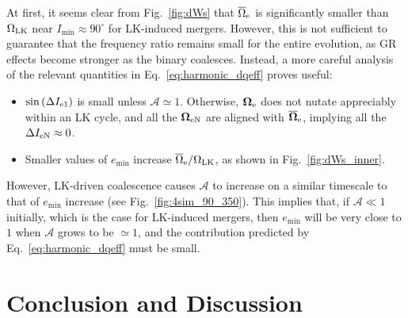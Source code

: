 \documentclass[
        twocolumn,
        twocolappendix
    ]{aastex63}
\renewcommand*{\bm}[1]{\boldsymbol{\mathbf{#1}}}
\newcommand*{\p}[1]{\left(#1\right)}
\begin{document}
At first, it seems clear from Fig.~\ref{fig:dWs} that $\overline{\Omega}_{\rm e}$
is significantly smaller than $\Omega_{\rm LK}$ near $I_{\min} \approx 90^\circ$
for LK-induced mergers. However, this is not sufficient to guarantee that the
frequency ratio remains small for the entire evolution, as GR effects become
stronger as the binary coalesces. Instead, a more careful analysis of the
relevant quantities in Eq.~\eqref{eq:harmonic_dqeff} proves useful:
\begin{itemize}
    \item $\sin \p{\Delta I_{\rm e1}}$ is small unless $\mathcal{A} \simeq
        1$. Otherwise, $\bm{\Omega}_{\rm e}$ does not nutate appreciably within
        an LK cycle, and all the $\bm{\Omega}_{\rm eN}$ are aligned with
        $\bm{\overline{\Omega}}_{\rm e}$, implying all the $\Delta I_{\rm eN}
        \approx 0$.

    \item Smaller values of $e_{\min}$ increase $\overline{\Omega}_{\rm e} /
        \Omega_{\rm LK}$, as shown in Fig.~\ref{fig:dWs_inner}.
\end{itemize}
However, LK-driven coalescence causes $\mathcal{A}$ to increase on a similar
timescale to that of $e_{\min}$ increase (see Fig.~\ref{fig:4sim_90_350}). This
implies that, if $\mathcal{A} \ll 1$ initially, which is the case for LK-induced
mergers, then $e_{\min}$ will be very close to $1$ when $\mathcal{A}$ grows to
be $\simeq 1$, and the contribution predicted by Eq.~\eqref{eq:harmonic_dqeff}
must be small.

\section{Conclusion and Discussion}\label{s:discussion}
\end{document}
